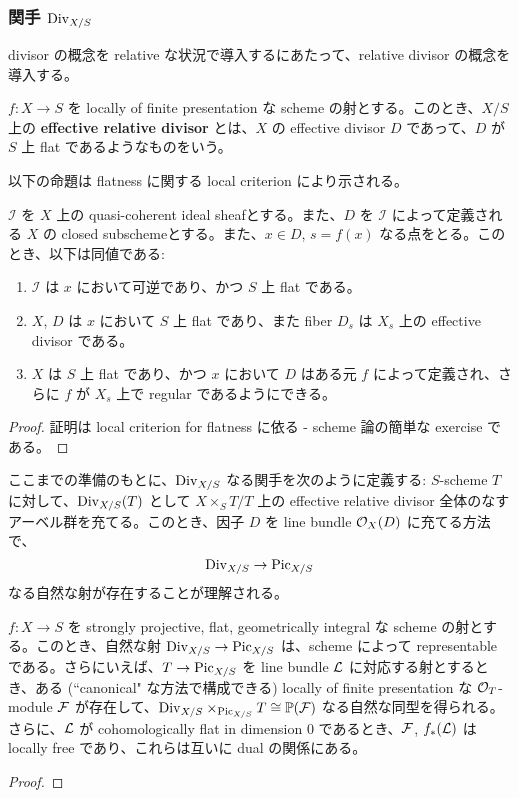 \subsubsection{関手 $\mathrm{Div}_{X / S}$}

divisor の概念を relative な状況で導入するにあたって、relative divisor の概念を導入する。

\begin{defn}
  $f \colon X \to S$ を locally of finite presentation な scheme の射とする。このとき、$X / S$ 上の \textbf{effective relative divisor} とは、$X$ の effective divisor $D$ であって、$D$ が $S$ 上 flat であるようなものをいう。
\end{defn}

以下の命題は flatness に関する local criterion により示される。

\begin{prop}
  $\mathcal{I}$ を $X$ 上の quasi-coherent ideal sheafとする。また、$D$ を $\mathcal{I}$ によって定義される $X$ の closed subschemeとする。また、$x \in D$, $s = f(x)$ なる点をとる。このとき、以下は同値である:
  \begin{enumerate}
    \item $\mathcal{I}$ は $x$ において可逆であり、かつ $S$ 上 flat である。
    \item $X$, $D$ は $x$ において $S$ 上 flat であり、また fiber $D_s$ は $X_s$ 上の effective divisor である。
    \item $X$ は $S$ 上 flat であり、かつ $x$ において $D$ はある元 $f$ によって定義され、さらに $f$ が $X_s$ 上で regular であるようにできる。
  \end{enumerate}
\end{prop}
\begin{proof}
  証明は local criterion for flatness に依る - scheme 論の簡単な exercise である。
\end{proof}

ここまでの準備のもとに、$\mathrm{Div}_{X / S}$ なる関手を次のように定義する: $S$-scheme $T$ に対して、$\mathrm{Div}_{X / S}(T)$ として $X \times_S T / T$ 上の effective relative divisor 全体のなすアーベル群を充てる。このとき、因子 $D$ を line bundle $\mathcal{O}_X(D)$ に充てる方法で、\[ \mathrm{Div}_{X / S} \to \mathrm{Pic}_{X / S} \] なる自然な射が存在することが理解される。



\begin{prop}\label{Prop:Rel_Rep_Div_to_Pic}
  $f \colon X \to S$ を strongly projective, flat, geometrically integral な scheme の射とする。このとき、自然な射 $\mathrm{Div}_{X / S} \to \mathrm{Pic}_{X / S}$ は、scheme によって representable である。さらにいえば、$T \to \mathrm{Pic}_{X / S}$ を line bundle $\mathcal{L}$ に対応する射とするとき、ある (``canonical" な方法で構成できる) locally of finite presentation な $\mathcal{O}_T$-module $\mathcal{F}$ が存在して、$\mathrm{Div}_{X / S} \times_{\mathrm{Pic}_{X / S}} T \cong \mathbb{P}(\mathcal{F})$ なる自然な同型を得られる。さらに、$\mathcal{L}$ が cohomologically flat in dimension 0 であるとき、$\mathcal{F}$, $f_*(\mathcal{L})$ は locally free であり、これらは互いに dual の関係にある。
\end{prop}
\begin{proof}
  
\end{proof}

